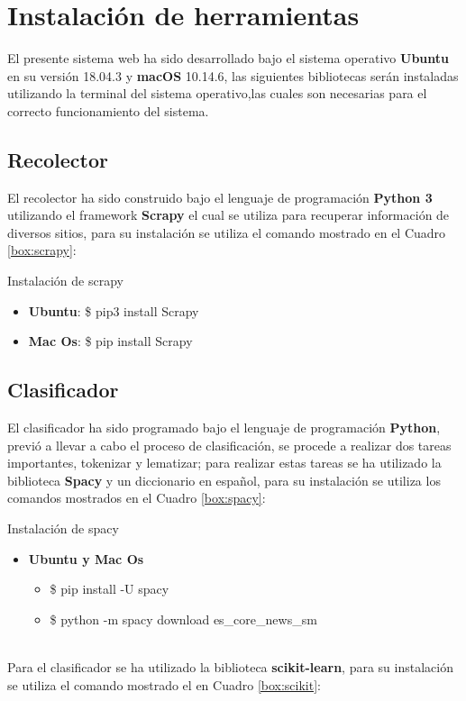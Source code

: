 \section{Instalación de herramientas}
El presente sistema web ha sido desarrollado bajo el sistema operativo \textbf{Ubuntu} en su versión 18.04.3 y \textbf{macOS} 10.14.6, las siguientes bibliotecas serán instaladas utilizando la terminal del sistema operativo,las cuales son necesarias para el correcto funcionamiento del sistema.


\subsection{Recolector}
El recolector ha sido construido bajo el lenguaje de programación \textbf{Python 3} utilizando el framework \textbf{Scrapy} el cual se utiliza para recuperar información de diversos sitios, para su instalación se utiliza el comando mostrado en el Cuadro \ref{box:scrapy}:\\

\begin{mygraybox}[label={box:scrapy}]{Instalación de scrapy} 
\begin{itemize}
	\item \textbf{Ubuntu}: \$ pip3 install Scrapy

	\item \textbf{Mac Os}: \$ pip install Scrapy
\end{itemize}
\end{mygraybox}


\subsection{Clasificador}
El clasificador ha sido programado bajo el lenguaje de programación \textbf{Python}, previó a llevar a cabo el proceso de clasificación, se procede a realizar dos tareas importantes, tokenizar y lematizar; para realizar estas tareas se ha utilizado la biblioteca \textbf{Spacy} y un diccionario en español, para su instalación se utiliza los comandos mostrados en el Cuadro \ref{box:spacy}:\\

\begin{mygraybox}[label={box:spacy}]{Instalación de spacy} 
\begin{itemize}
	\item \textbf{Ubuntu y Mac Os}
	\begin{itemize}
		\item \$ pip install -U spacy
		\item \$ python -m spacy download es\_core\_news\_sm
	\end{itemize}	
\end{itemize}
\end{mygraybox}
\ \\
Para el clasificador se ha utilizado la biblioteca \textbf{scikit-learn}, para su instalación se utiliza el comando mostrado el en Cuadro \ref{box:scikit}:\\

